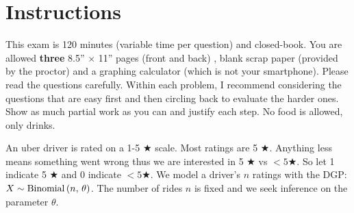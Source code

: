 \documentclass[12pt]{article}
\begin{document}
\section*{Instructions}
This exam is 120 minutes (variable time per question) and closed-book. You are allowed \textbf{three} 8.5'' $\times$ 11'' pages (front and back) , blank scrap paper (provided by the proctor) and a graphing calculator (which is not your smartphone). Please read the questions carefully. Within each problem, I recommend considering the questions that are easy first and then circling back to evaluate the harder ones. Show as much partial work as you can and justify each step. No food is allowed, only drinks. %

\pagebreak



\problem An uber driver is rated on a 1-5 $\bigstar$ scale. Most ratings are 5 $\bigstar$. Anything less means something went wrong thus we are interested in 5 $\bigstar$ vs $<5 \bigstar$. So let 1 indicate 5 $\bigstar$ and 0 indicate $<5\bigstar$. We model a driver's $n$ ratings with the DGP: $X  \sim \mathrm{Binomial}\left(n,\,\theta\right)$. The number of rides $n$ is fixed and we seek inference on the parameter $\theta$.
\end{document}
